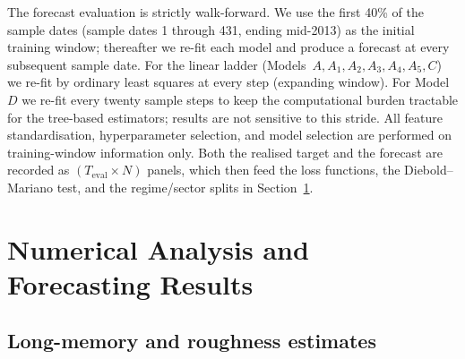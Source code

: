 \documentclass[11pt,a4paper]{article}
\begin{document}
The forecast evaluation is strictly walk-forward. We use the first 40\%
of the sample dates (sample dates 1 through 431, ending mid-2013) as the
initial training window; thereafter we re-fit each model and produce a
forecast at every subsequent sample date. For the linear ladder
(Models~$A,A_1,A_2,A_3,A_4,A_5,C$) we re-fit by ordinary least squares
at every step (expanding window). For Model~$D$ we
re-fit every twenty sample steps to keep the computational burden
tractable for the tree-based estimators; results are not sensitive to
this stride. All feature standardisation, hyperparameter selection, and
model selection are performed on training-window information only.
Both the realised target and the forecast are recorded as
$(T_{\mathrm{eval}}\!\times\!N)$ panels, which then feed the loss
functions, the Diebold--Mariano test, and the regime/sector splits in
Section~\ref{sec:results}.

\section{Numerical Analysis and Forecasting Results}
\label{sec:results}

\subsection{Long-memory and roughness estimates}
\end{document}
